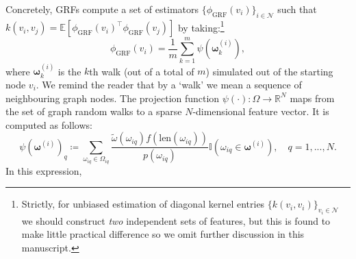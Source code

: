 Concretely, GRFs compute a set of estimators $\{\phi_\textrm{GRF}(v_i)\}_{i \in \mathcal{N}}$ such that $k(v_i,v_j) = \mathbb{E}[\phi_\textrm{GRF}(v_i)^\top \phi_\textrm{GRF}(v_j)]$ by taking:\footnote{Strictly, for unbiased estimation of diagonal kernel entries $\{k(v_i,v_i)\}_{v_i \in \mathcal{N}}$ we should construct \emph{two} independent sets of features, but this is found to make little practical difference \citep{reid2023universal} so we omit further discussion in this manuscript.}
\begin{equation}
    \phi_\textrm{GRF}(v_i) = \frac{1}{m} \sum_{k=1}^m \psi( \boldsymbol{\omega}_k^{(i)}),
\end{equation}
where $\boldsymbol{\omega}_k^{(i)}$ is the $k$th walk (out of a total of $m$) simulated out of the starting node $v_i$. We remind the reader that by a `walk' we mean a sequence of neighbouring graph nodes. 
The projection function $\psi(\cdot): \Omega \to \mathbb{R}^N$ maps from the set of graph random walks  to a sparse $N$-dimensional feature vector.
It is computed as follows:
\begin{equation}
    \psi( \boldsymbol{\omega}^{(i)})_q \coloneqq \sum_{\omega_{iq} \in \Omega_{iq}} \frac{\widetilde{\omega}(\omega_{iq}) f(\textrm{len}(\omega_{iq}))}{p(\omega_{iq})} \mathbb{I}(\omega_{iq} \in \boldsymbol{\omega}^{(i)}), \quad q = 1,...,N.
\end{equation}
In this expression,
